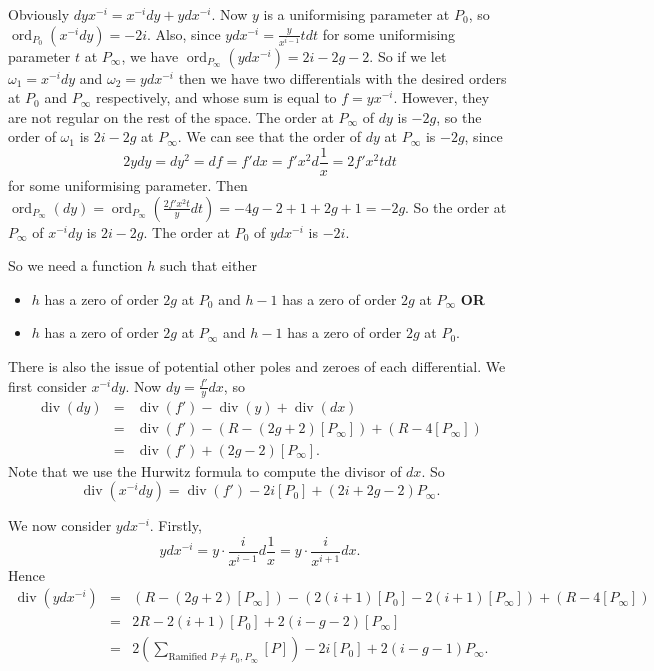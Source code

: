 \documentclass[draft, 11pt]{article} %
\theoremstyle{plain}
\theoremstyle{remark}
\DeclareMathOperator{\ord}{ord}
\DeclareMathOperator{\di}{div}
\begin{document}
Obviously $dyx^{-i} = x^{-i}dy + ydx^{-i}$.
Now $y$ is a uniformising parameter at $P_0$, so $\ord_{P_0}(x^{-i}dy) = -2i$.
Also, since $ydx^{-i} = \frac{y}{x^{i-1}}tdt$ for some uniformising parameter $t$ at $P_\infty$, we have $\ord_{P_\infty}(ydx^{-i}) = 2i-2g-2$.
So if we let $\omega_1 = x^{-i}dy$ and $\omega_2 = ydx^{-i}$ then we have two differentials with the desired orders at $P_0$ and $P_\infty$ respectively, and whose sum is equal to $f= yx^{-i}$.
However, they are not regular on the rest of the space.
The order at $P_\infty$ of $dy$ is $-2g$, so the order of $\omega_1$ is $2i-2g$ at $P_\infty$.
We can see that the order of $dy$ at $P_\infty$ is $-2g$, since
\[
2ydy = dy^2 = df = f'dx = f'x^2d\frac{1}{x} = 2f'x^2tdt
\]
for some uniformising parameter.
Then $\ord_{P_\infty}(dy) = \ord_{P_\infty}\left (\frac{2f'x^2t}{y}dt \right) = -4g - 2 +1 +2g+1 = -2g$.
So the order at $P_\infty$ of $x^{-i}dy$ is $2i-2g$.
The order at $P_0$ of $ydx^{-i}$ is $-2i$.


So we need a function $h$ such that either 
\begin{itemize}
 	\item $h$ has a zero of order $2g$ at $P_0$ and $h-1$ has a zero of order $2g$ at $P_\infty$ {\bf OR}
	\item $h$ has a zero of order $2g$ at $P_\infty$ and $h-1$ has a zero of order $2g$ at $P_0$.
\end{itemize}

There is also the issue of potential other poles and zeroes of each differential.
We first consider $x^{-i}dy$.
Now $ dy = \frac{f'}{y}dx$, so \begin{eqnarray*} \di (dy) & = & \di(f') - \di (y) + \di (dx) \\ & = & \di(f') - (R - (2g+2)[P_\infty]) + (R - 4[P_\infty])\\  & = & \di(f') +(2g-2)[P_\infty].\end{eqnarray*}
Note that we use the Hurwitz formula to compute the divisor of $dx$.
So \[ \di(x^{-i}dy) = \di(f') -2i[P_0] + (2i +2g-2)P_{\infty}. \]

We now consider $ydx^{-i}$.
Firstly, \[ y dx^{-i} = y\cdot \frac{i}{x^{i-1}}d\frac{1}{x} = y \cdot \frac{i}{x^{i+1}} dx.\]
Hence \begin{eqnarray*} \di (ydx^{-i}) & = & (R - (2g+2)[P_\infty]) -(2(i+1)[P_0] - 2(i+1)[P_\infty]) + (R - 4[P_\infty]) \\ & = &  2R - 2(i+1)[P_0] + 2(i-g-2)[P_\infty] \\ & = & 2\left ( \sum_{\text{Ramified } P\neq P_0, P_\infty}[P]\right) - 2i[P_0] +2(i-g-1)P_\infty .\end{eqnarray*}




%

\end{document}

